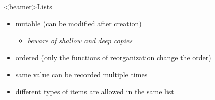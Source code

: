 \begin{frame}<beamer>{Lists}

  \begin{itemize}
    \item<1-> mutable (can be modified after creation)
    \begin{itemize}
      \item<2-> \textit{beware of shallow and deep copies}
    \end{itemize}
    \item<3-> ordered (only the functions of reorganization change the order)
    \item<4-> same value can be recorded multiple times
    \item<5-> different types of items are allowed in the same list
  \end{itemize}

\end{frame}


